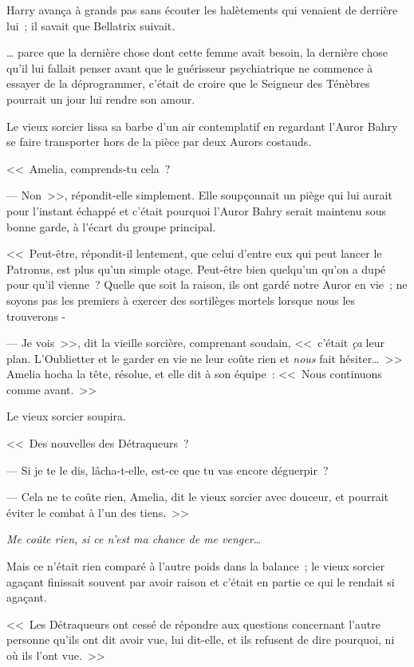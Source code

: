 Harry avança à grands pas sans écouter les halètements qui venaient de derrière lui~; il savait que Bellatrix suivait.

… parce que la dernière chose dont cette femme avait besoin, la dernière chose qu'il lui fallait penser avant que le guérisseur psychiatrique ne commence à essayer de la déprogrammer, c'était de croire que le Seigneur des Ténèbres pourrait un jour lui rendre son amour.

\later

Le vieux sorcier lissa sa barbe d'un air contemplatif en regardant l'Auror Bahry se faire transporter hors de la pièce par deux Aurors costauds.

<<~Amelia, comprends-tu cela~?

--- Non~>>, répondit-elle simplement. Elle soupçonnait un piège qui lui aurait pour l'instant échappé et c'était pourquoi l'Auror Bahry serait maintenu sous bonne garde, à l'écart du groupe principal.

<<~Peut-être, répondit-il lentement, que celui d'entre eux qui peut lancer le Patronus, est plus qu'un simple otage. Peut-être bien quelqu'un qu'on a dupé pour qu'il vienne~? Quelle que soit la raison, ils ont gardé notre Auror en vie~; ne soyons pas les premiers à exercer des sortilèges mortels lorsque nous les trouverons -

--- Je vois~>>, dit la vieille sorcière, comprenant soudain, <<~c'était \emph{ça} leur plan. L'Oublietter et le garder en vie ne leur coûte rien et \emph{nous} fait hésiter…~>> Amelia hocha la tête, résolue, et elle dit à son équipe~: <<~Nous continuons comme avant.~>>

Le vieux sorcier soupira.

<<~Des nouvelles des Détraqueurs~?

--- Si je te le dis, lâcha-t-elle, est-ce que tu vas encore déguerpir~?

--- Cela ne te coûte rien, Amelia, dit le vieux sorcier avec douceur, et pourrait éviter le combat à l'un des tiens.~>>

\emph{Me coûte rien, si ce n'est ma chance de me venger…}

Mais ce n'était rien comparé à l'autre poids dans la balance~; le vieux sorcier agaçant finissait souvent par avoir raison et c'était en partie ce qui le rendait si agaçant.

<<~Les Détraqueurs ont cessé de répondre aux questions concernant l'autre personne qu'ils ont dit avoir vue, lui dit-elle, et ils refusent de dire pourquoi, ni où ils l'ont vue.~>>

